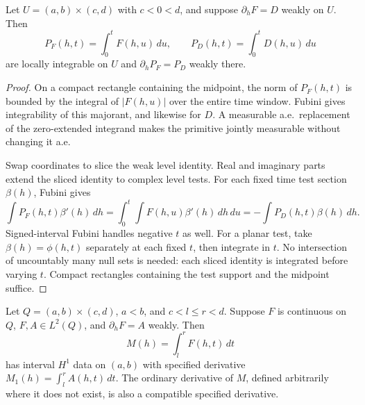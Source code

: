 \begin{lemma}
\label{lem:weak-parameter-integral}
\leanok
Let $U=(a,b)\times(c,d)$ with $c<0<d$, and suppose
$\partial_hF=D$ weakly on $U$. Then
\[
 P_F(h,t)=\int_0^t F(h,u)\,du,\qquad P_D(h,t)=\int_0^t D(h,u)\,du
\]
are locally integrable on $U$ and $\partial_hP_F=P_D$ weakly there.
\end{lemma}

\begin{proof}
\leanok
On a compact rectangle containing the midpoint, the norm of $P_F(h,t)$
is bounded by the integral of $|F(h,u)|$ over the entire time window.
Fubini gives integrability of this majorant, and likewise for $D$.
A measurable a.e.\ replacement of the zero-extended integrand makes the
primitive jointly measurable without changing it a.e.

Swap coordinates to slice the weak level identity. Real and imaginary
parts extend the sliced identity to complex level tests.
For each fixed time test section $\beta(h)$, Fubini gives
\[
 \int P_F(h,t)\beta'(h)\,dh
 =\int_0^t\!\int F(h,u)\beta'(h)\,dh\,du
 =-\int P_D(h,t)\beta(h)\,dh.
\]
Signed-interval Fubini handles negative $t$ as well.
For a planar test, take $\beta(h)=\phi(h,t)$ separately at each fixed
$t$, then integrate in $t$. No intersection of uncountably many null sets
is needed: each sliced identity is integrated before varying $t$.
Compact rectangles containing the test support and the midpoint suffice.
\end{proof}

\begin{lemma}
\label{lem:fixed-window-h1}
\leanok
Let $Q=(a,b)\times(c,d)$, $a<b$, and $c<l\le r<d$.
Suppose $F$ is continuous on $Q$, $F,A\in L^2(Q)$, and
$\partial_hF=A$ weakly. Then
\[
 M(h)=\int_l^r F(h,t)\,dt
\]
has interval $H^1$ data on $(a,b)$ with specified derivative
$M_1(h)=\int_l^r A(h,t)\,dt$.
The ordinary derivative of $M$, defined arbitrarily where it does not
exist, is also a compatible specified derivative.
\end{lemma}

